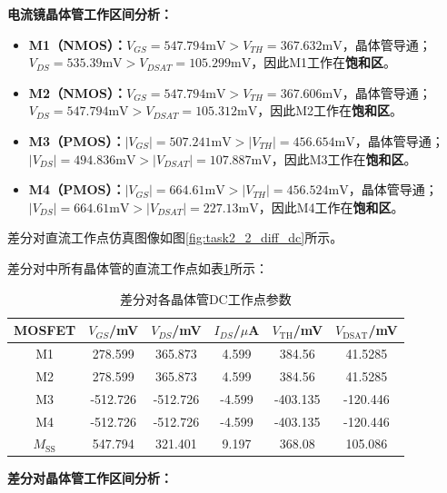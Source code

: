 \documentclass[UTF8,12pt,a4paper]{ctexart}
\begin{document}
\textbf{电流镜晶体管工作区间分析：}

\begin{itemize}
\item \textbf{M1（NMOS）：}$V_{GS} = 547.794\text{mV} > V_{TH} = 367.632\text{mV}$，晶体管导通；$V_{DS} = 535.39\text{mV} > V_{DSAT} = 105.299\text{mV}$，因此M1工作在\textbf{饱和区}。

\item \textbf{M2（NMOS）：}$V_{GS} = 547.794\text{mV} > V_{TH} = 367.606\text{mV}$，晶体管导通；$V_{DS} = 547.794\text{mV} > V_{DSAT} = 105.312\text{mV}$，因此M2工作在\textbf{饱和区}。

\item \textbf{M3（PMOS）：}$|V_{GS}| = 507.241\text{mV} > |V_{TH}| = 456.654\text{mV}$，晶体管导通；$|V_{DS}| = 494.836\text{mV} > |V_{DSAT}| = 107.887\text{mV}$，因此M3工作在\textbf{饱和区}。

\item \textbf{M4（PMOS）：}$|V_{GS}| = 664.61\text{mV} > |V_{TH}| = 456.524\text{mV}$，晶体管导通；$|V_{DS}| = 664.61\text{mV} > |V_{DSAT}| = 227.13\text{mV}$，因此M4工作在\textbf{饱和区}。
\end{itemize}

差分对直流工作点仿真图像如图\ref{fig:task2_2_diff_dc}所示。

差分对中所有晶体管的直流工作点如表\ref{tab:task2_2_diff}所示：

\begin{table}[h]
\centering
\caption{差分对各晶体管DC工作点参数}
\label{tab:task2_2_diff}
\begin{tabular}{|c|c|c|c|c|c|}
\hline
MOSFET & $V_{GS}$/mV & $V_{DS}$/mV & $I_{DS}$/$\mu$A & $V_{\text{TH}}$/mV & $V_{\text{DSAT}}$/mV \\
\hline
M1 & 278.599 & 365.873 & 4.599 & 384.56 & 41.5285 \\
\hline
M2 & 278.599 & 365.873 & 4.599 & 384.56 & 41.5285 \\
\hline
M3 & -512.726 & -512.726 & -4.599 & -403.135 & -120.446 \\
\hline
M4 & -512.726 & -512.726 & -4.599 & -403.135 & -120.446 \\
\hline
$M_{\text{SS}}$ & 547.794 & 321.401 & 9.197 & 368.08 & 105.086 \\
\hline
\end{tabular}
\end{table}

\textbf{差分对晶体管工作区间分析：}
\end{document}
